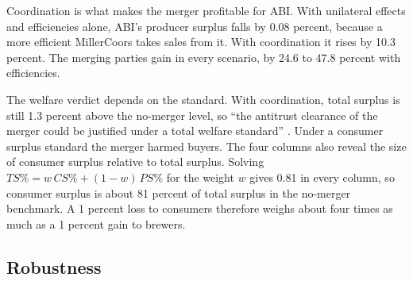 Coordination is what makes the merger profitable for ABI. With unilateral effects and efficiencies alone, ABI's
producer surplus falls by 0.08 percent, because a more efficient MillerCoors takes sales from it. With coordination
it rises by 10.3 percent. The merging parties gain in every scenario, by 24.6 to 47.8 percent with efficiencies.

The welfare verdict depends on the standard. With coordination, total surplus is still 1.3 percent above the
no-merger level, so ``the antitrust clearance of the merger could be justified under a total welfare standard''
\citep[p.~1788]{MillerWeinberg2017}. Under a consumer surplus standard the merger harmed buyers. The four columns
also reveal the size of consumer surplus relative to total surplus. Solving $TS\% = w\,CS\% + (1-w)\,PS\%$ for the
weight $w$ gives 0.81 in every column, so consumer surplus is about 81 percent of total surplus in the no-merger
benchmark. A 1 percent loss to consumers therefore weighs about four times as much as a 1 percent gain to brewers.

\subsection{Robustness}\label{sec:11-mc-robust}

